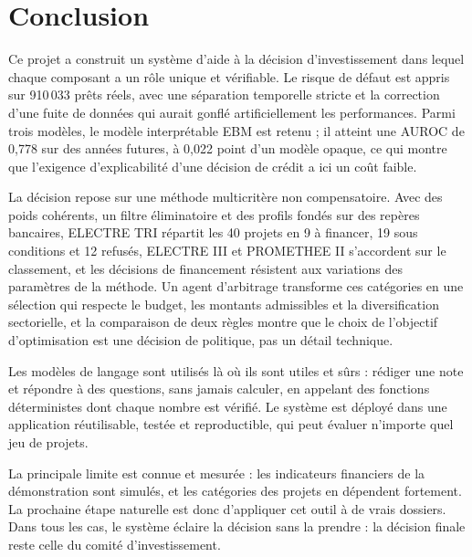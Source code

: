 \chapter{Conclusion}\label{chap:conclusion}

Ce projet a construit un système d'aide à la décision d'investissement dans lequel chaque composant a un rôle unique et
vérifiable. Le risque de défaut est appris sur 910\,033 prêts réels, avec une séparation temporelle stricte et la
correction d'une fuite de données qui aurait gonflé artificiellement les performances. Parmi trois modèles, le modèle
interprétable EBM est retenu ; il atteint une AUROC de 0,778 sur des années futures, à 0,022 point d'un modèle opaque,
ce qui montre que l'exigence d'explicabilité d'une décision de crédit a ici un coût faible.

La décision repose sur une méthode multicritère non compensatoire. Avec des poids cohérents, un filtre éliminatoire et
des profils fondés sur des repères bancaires, ELECTRE TRI répartit les 40 projets en 9 à financer, 19 sous conditions et
12 refusés, ELECTRE III et PROMETHEE II s'accordent sur le classement, et les décisions de financement résistent aux
variations des paramètres de la méthode. Un agent d'arbitrage transforme ces catégories en une sélection qui respecte
le budget, les montants admissibles et la diversification sectorielle, et la comparaison de deux règles montre que le
choix de l'objectif d'optimisation est une décision de politique, pas un détail technique.

Les modèles de langage sont utilisés là où ils sont utiles et sûrs : rédiger une note et répondre à des questions,
sans jamais calculer, en appelant des fonctions déterministes dont chaque nombre est vérifié. Le système est déployé
dans une application réutilisable, testée et reproductible, qui peut évaluer n'importe quel jeu de projets.

La principale limite est connue et mesurée : les indicateurs financiers de la démonstration sont simulés, et les
catégories des projets en dépendent fortement. La prochaine étape naturelle est donc d'appliquer cet outil à de vrais
dossiers. Dans tous les cas, le système éclaire la décision sans la prendre : la décision finale reste celle du comité
d'investissement.
